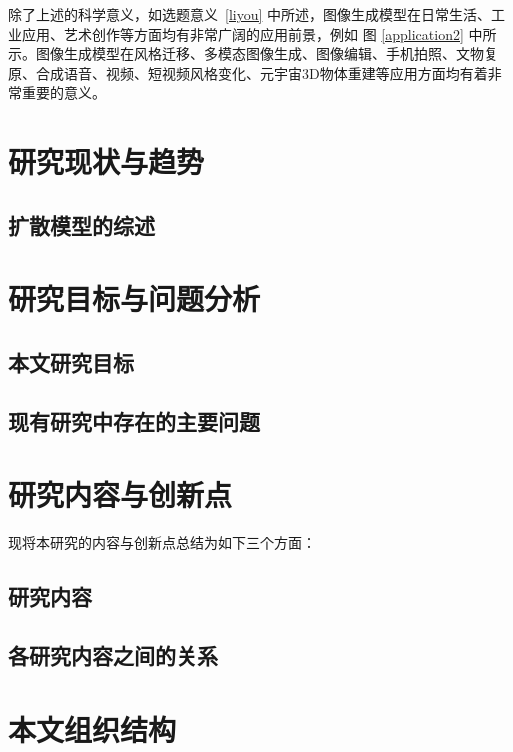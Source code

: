 
除了上述的科学意义，如选题意义~\ref{liyou} 中所述，图像生成模型在日常生活、工业应用、艺术创作等方面均有非常广阔的应用前景，例如
图
\ref{application2} 中所示。图像生成模型在风格迁移、多模态图像生成、图像编辑、手机拍照、文物复原、合成语音、视频、短视频风格变化、元宇宙3D物体重建等应用方面均有着非常重要的意义。

\section{研究现状与趋势}
\subsection{扩散模型的综述}
%

\section{研究目标与问题分析}


\subsection{本文研究目标}



\subsection{现有研究中存在的主要问题}


\section{研究内容与创新点}

现将本研究的内容与创新点总结为如下三个方面：
\subsection{研究内容}

\subsection{各研究内容之间的关系}

\section{本文组织结构}


